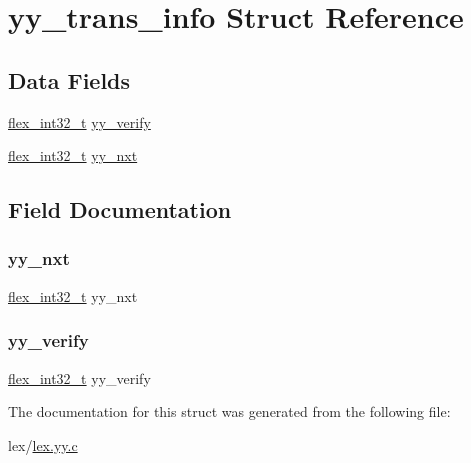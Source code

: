 \hypertarget{structyy__trans__info}{}\section{yy\+\_\+trans\+\_\+info Struct Reference}
\label{structyy__trans__info}
\subsection*{Data Fields}
\begin{DoxyCompactItemize}
\item 
\hyperlink{lex_8yy_8c_a838ce943cf44ef7769480714fc6c3ba9}{flex\+\_\+int32\+\_\+t} \hyperlink{structyy__trans__info_a5faf5583708f5fa457bc1cb9bab86e38}{yy\+\_\+verify}
\item 
\hyperlink{lex_8yy_8c_a838ce943cf44ef7769480714fc6c3ba9}{flex\+\_\+int32\+\_\+t} \hyperlink{structyy__trans__info_a51bfd9e47041873b7b8075c677d1cfe1}{yy\+\_\+nxt}
\end{DoxyCompactItemize}


\subsection{Field Documentation}
\mbox{\label{structyy__trans__info_a51bfd9e47041873b7b8075c677d1cfe1}} 
\subsubsection{\texorpdfstring{yy\+\_\+nxt}{yy\_nxt}}
{\footnotesize\ttfamily \hyperlink{lex_8yy_8c_a838ce943cf44ef7769480714fc6c3ba9}{flex\+\_\+int32\+\_\+t} yy\+\_\+nxt}

\mbox{\label{structyy__trans__info_a5faf5583708f5fa457bc1cb9bab86e38}} 
\subsubsection{\texorpdfstring{yy\+\_\+verify}{yy\_verify}}
{\footnotesize\ttfamily \hyperlink{lex_8yy_8c_a838ce943cf44ef7769480714fc6c3ba9}{flex\+\_\+int32\+\_\+t} yy\+\_\+verify}



The documentation for this struct was generated from the following file\+:\begin{DoxyCompactItemize}
\item 
lex/\hyperlink{lex_8yy_8c}{lex.\+yy.\+c}\end{DoxyCompactItemize}
